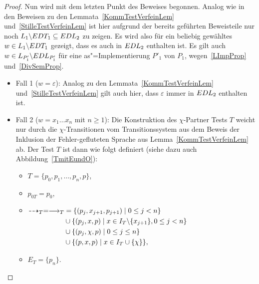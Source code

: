 \begin{proof}
  Nun wird mit dem letzten Punkt des Beweises begonnen. Analog wie in den
  Beweisen zu den Lemmata~\ref{KommTestVerfeinLem} und~\ref{StilleTestVerfeinLem}
  ist hier aufgrund der bereits geführten Beweisteile nur noch $L_1\backslash
  EDT _1 \subseteq EDL _2$ zu zeigen. Es wird also für ein beliebig gewähltes
  $w\in L_1\backslash EDT _1$ gezeigt, dass es auch in $EDL _2$ enthalten
  ist. Es gilt auch $w\in L _{P'_1}\backslash EDL _{P'_1}$ für eine
  as"=Implementierung $P'_1$ von $P_1$, wegen~\ref{LImpProp}
  und~\ref{DivSemProp}.
  \begin{itemize}
    \item Fall 1 ($w = \varepsilon$): Analog zu den
      Lemmata~\ref{KommTestVerfeinLem} und~\ref{StilleTestVerfeinLem} gilt auch
      hier, dass $\varepsilon$ immer in $EDL _2$ enthalten ist.
    \item Fall 2 ($w = x_1\dots x_n$ mit $n \geq 1$): Die Konstruktion des
      $\chi$-Partner Tests $T$ weicht nur durch die $\chi$-Transitionen vom
      Transitionssystem aus dem Beweis der Inklusion der Fehler-gefluteten
      Sprache \EL{} aus Lemma~\ref{KommTestVerfeinLem} ab. Der Test $T$ ist
      dann wie folgt definiert (siehe dazu auch Abbildung~\ref{TmitEundO}):
      \begin{itemize}
        \item $T=\{p_0,p_1,\dots ,p_n,p\}$,
        \item $p_{0T}=p_0$,
        \item $\begin{aligned}[t]
            \may _T = \must _T &= \{(p_j,x_{j+1},p_{j+1})\mid 0\leq j< n\}\\
            &\cup\{(p_j,x,p)\mid x\in I_T\backslash\{x_{j+1}\},0\leq j < n\}\\
            &\cup\{(p_j,\chi ,p)\mid 0\leq j\leq n\}\\
            &\cup\{(p,x ,p)\mid x\in I_T\cup \{\chi\}\},
        \end{aligned}$
        \item $E_T=\{p_n\}$.
      \end{itemize}
      \begin{figure} [h!tbp]
      \begin{center}
\end{center}
\end{figure}
\end{itemize}
\end{proof}
